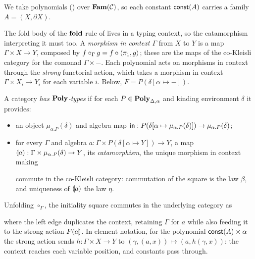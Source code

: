 We take polynomials () over $\mathbf{Fam}(\mathcal{C})$, so each constant
$\mathsf{const}(A)$ carries a family $A = (X, \partial X)$.

The fold body of the $\mathbf{fold}$ rule of  lives in a typing context,
so the catamorphism interpreting it must too. A \emph{morphism in context $\Gamma$} from $X$ to $Y$ is
a map $\Gamma \times X \to Y$, composed by $f \circ_\Gamma g = f \circ \langle \pi_1, g\rangle$; these are
the maps of the co-Kleisli category for the comonad $\Gamma \times -$. Each polynomial acts on
morphisms in context through the \emph{strong} functorial action, which takes a morphism in context
$\Gamma \times X_i \to Y_i$ for each variable $i$. Below, $F = P(\delta[\alpha \mapsto -])$.

\begin{definition}
\label{def:polynomial-types:has-poly}
A category \emph{has $\mathbf{Poly}$-types} if for each $P \in \mathbf{Poly}_{\Delta,\alpha}$ and kinding environment $\delta$
it provides:
\begin{itemize}
\item an object $\mu_{\alpha.P}(\delta)$ and algebra map $\mathsf{in} : P(\delta[\alpha \mapsto
  \mu_{\alpha.P}(\delta)]) \to \mu_{\alpha.P}(\delta)$;
\item for every $\Gamma$ and algebra $a : \Gamma \times P(\delta[\alpha \mapsto Y]) \to Y$, a map
  $\llparenthesis a \rrparenthesis : \Gamma \times \mu_{\alpha.P}(\delta) \to Y$, its \emph{catamorphism}, the unique
  morphism in context making
  \begin{center}
  \end{center}
  commute in the co-Kleisli category: commutation of the square is the law $\beta$, and uniqueness
  of $\llparenthesis a \rrparenthesis$ the law $\eta$.
\end{itemize}
\end{definition}

\noindent
Unfolding $\circ_\Gamma$, the initiality square commutes in the underlying category as
\begin{center}
\end{center}
\noindent
where the left edge duplicates the context, retaining $\Gamma$ for $a$ while also feeding it
to the strong action $F\llparenthesis a \rrparenthesis$. In element notation, for the polynomial $\mathsf{const}(A) \times \alpha$
the strong action sends $h : \Gamma \times X \to Y$ to $(\gamma, (a, x)) \mapsto (a, h(\gamma, x))$:
the context reaches each variable position, and constants pass through.

